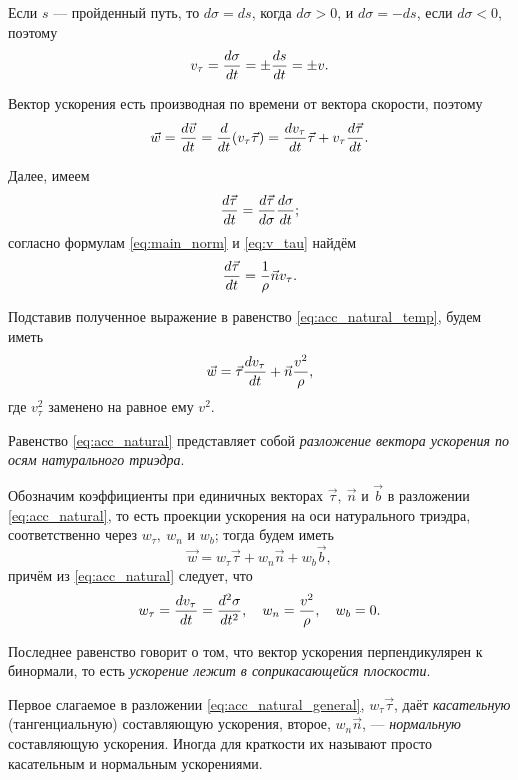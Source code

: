Если $s$ --- пройденный путь, то $d \sigma = ds$, когда $d \sigma > 0$, и
$d \sigma = -ds$, если $d \sigma <0$, поэтому
\begin{equation}
  \label{eq:v_tau}
  v_\tau = \dt[\sigma] = \pm \dt[s] = \pm v.
\end{equation}

Вектор ускорения есть производная по времени от вектора скорости, поэтому
\begin{equation}
  \label{eq:acc_natural_temp}
  \vec{w} = \dt[\vec{v}] = \dt (v_\tau \vec{\tau}) = \dt[v_\tau] \vec{\tau} +
    v_\tau \dt[\vec{\tau}].
\end{equation}

Далее, имеем
\begin{equation*}
  \dt[\vec{\tau}] = \der[\vec{\tau}]{\sigma} \dt[\sigma];
\end{equation*}
согласно формулам \ref{eq:main_norm} и \ref{eq:v_tau} найдём
\begin{equation*}
  \dt[\vec{\tau}] = \frac{1}{\rho} \vec{n} v_\tau.
\end{equation*}

Подставив полученное выражение в равенство \ref{eq:acc_natural_temp}, будем
иметь
\begin{equation}
  \label{eq:acc_natural}
  \vec{w} = \vec{\tau} \dt[v_\tau] + \vec{n} \frac{v^2}{\rho},
\end{equation}
где $v_\tau^2$ заменено на равное ему $v^2$.

Равенство \ref{eq:acc_natural} представляет собой \textit{разложение вектора
ускорения по осям натурального триэдра}.

Обозначим коэффициенты при единичных векторах $\vec{\tau},~\vec{n}$ и $\vec{b}$
в разложении \ref{eq:acc_natural}, то есть проекции ускорения на оси
натурального триэдра, соответственно через $w_\tau,~w_n$ и $w_b$; тогда будем
иметь
\begin{equation}
  \label{eq:acc_natural_general}
  \vec{w} = w_\tau \vec{\tau} + w_n \vec{n} + w_b \vec{b},
\end{equation}
причём из \autoref{eq:acc_natural} следует, что
\begin{equation*}
  w_\tau = \dt[v_\tau] = \ddt[\sigma], \quad w_n = \frac{v^2}{\rho},
    \quad w_b = 0.
\end{equation*}

Последнее равенство говорит о том, что вектор ускорения перпендикулярен к
бинормали, то есть \textit{ускорение лежит в соприкасающейся плоскости}.

Первое слагаемое в разложении \ref{eq:acc_natural_general}, $w_\tau \vec{\tau}$,
даёт \textit{касательную} (тангенциальную) составляющую ускорения, второе, $w_n
\vec{n}$, --- \textit{нормальную} составляющую ускорения. Иногда для краткости
их называют просто касательным и нормальным ускорениями.

